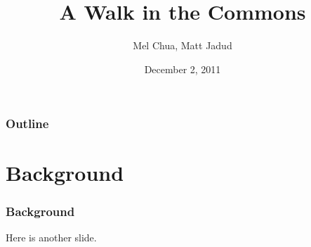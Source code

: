 \documentclass{beamer}
\title{A Walk in the Commons}
\author{Mel Chua, Matt Jadud}
\date{December 2, 2011}
\begin{document}
\titlepage

\begin{frame} 
\frametitle{Outline}
\end{frame} 

\section{Background}
\begin{frame} 
\frametitle{Background}
Here is another slide. 
\end{frame}
\end{document}
